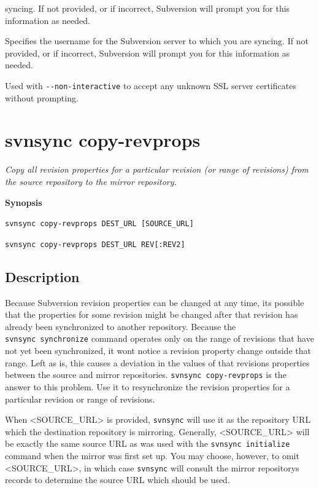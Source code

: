 \begin{description}
syncing. If not provided, or if incorrect, Subversion will prompt you
for this information as needed.
\item[\protect\phantomsection\label{svn.ref.svnsync.sw.sync_username}{}\texttt{-\/-sync-username}
\textless NAME\textgreater{}]
Specifies the username for the Subversion server to which you are
syncing. If not provided, or if incorrect, Subversion will prompt you
for this information as needed.
\item[\protect\phantomsection\label{svn.ref.svnsync.sw.trust_server_cert}{}\texttt{-\/-trust-server-cert}]
Used with \texttt{-\/-non-interactive} to accept any unknown SSL server
certificates without prompting.
\end{description}

\section{svnsync copy-revprops}\label{svn.ref.svnsync.c.copy-revprops}

\emph{Copy all revision properties for a particular revision (or range
of revisions) from the source repository to the mirror repository.}

\textbf{Synopsis}

\texttt{svnsync\ copy-revprops\ DEST\_URL\ {[}SOURCE\_URL{]}}

\texttt{svnsync\ copy-revprops\ DEST\_URL\ REV{[}:REV2{]}}

\subsection{Description}

Because Subversion revision properties can be changed at any time,
it\textquotesingle s possible that the properties for some revision
might be changed after that revision has already been synchronized to
another repository. Because the \texttt{svnsync\ synchronize} command
operates only on the range of revisions that have not yet been
synchronized, it won\textquotesingle t notice a revision property change
outside that range. Left as is, this causes a deviation in the values of
that revision\textquotesingle s properties between the source and mirror
repositories. \texttt{svnsync\ copy-revprops} is the answer to this
problem. Use it to resynchronize the revision properties for a
particular revision or range of revisions.

When \textless SOURCE\_URL\textgreater{} is provided, \texttt{svnsync}
will use it as the repository URL which the destination repository is
mirroring. Generally, \textless SOURCE\_URL\textgreater{} will be
exactly the same source URL as was used with the
\texttt{svnsync\ initialize} command when the mirror was first set up.
You may choose, however, to omit \textless SOURCE\_URL\textgreater, in
which case \texttt{svnsync} will consult the mirror
repository\textquotesingle s records to determine the source URL which
should be used.

